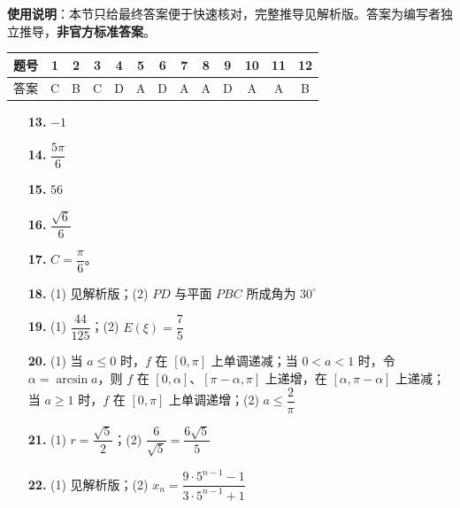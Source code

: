 
\begin{gknotice}
\textbf{使用说明}：本节只给最终答案便于快速核对，完整推导见解析版。答案为编写者独立推导，\textbf{非官方标准答案}。
\end{gknotice}

\begin{center}\begin{tabular}{ccccccccccccc}
\toprule
题号 & 1 & 2 & 3 & 4 & 5 & 6 & 7 & 8 & 9 & 10 & 11 & 12 \\
\midrule
答案 & C & B & C & D & A & D & A & A & D & A & A & B \\
\bottomrule
\end{tabular}\end{center}

\begin{itemize}[leftmargin=2.6em]
  \item[\textbf{13.}] $-1$
  \item[\textbf{14.}] $\dfrac{5\pi}{6}$
  \item[\textbf{15.}] $56$
  \item[\textbf{16.}] $\dfrac{\sqrt6}{6}$
\end{itemize}

\begin{itemize}[leftmargin=2.6em]
  \item[\textbf{17.}] $C=\dfrac\pi6$。
  \item[\textbf{18.}] (1) 见解析版；(2) $PD$ 与平面 $PBC$ 所成角为 $30^\circ$
  \item[\textbf{19.}] (1) $\dfrac{44}{125}$；(2) $E(\xi)=\dfrac75$
  \item[\textbf{20.}] (1) 当 $a\leqslant0$ 时，$f$ 在 $[0,\pi]$ 上单调递减；当 $0<a<1$ 时，令 $\alpha=\arcsin a$，则 $f$ 在 $[0,\alpha]$、$[\pi-\alpha,\pi]$ 上递增，在 $[\alpha,\pi-\alpha]$ 上递减；当 $a\geqslant1$ 时，$f$ 在 $[0,\pi]$ 上单调递增；(2) $a\leqslant\dfrac2\pi$
  \item[\textbf{21.}] (1) $r=\dfrac{\sqrt5}{2}$；(2) $\dfrac6{\sqrt5}=\dfrac{6\sqrt5}{5}$
  \item[\textbf{22.}] (1) 见解析版；(2) $x_n=\dfrac{9\cdot5^{n-1}-1}{3\cdot5^{n-1}+1}$
\end{itemize}
